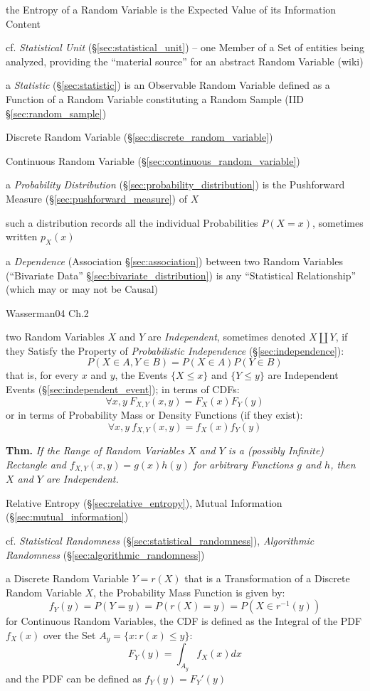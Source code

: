 the Entropy of a Random Variable is the Expected Value of its Information
Content

\fist cf. \emph{Statistical Unit} (\S\ref{sec:statistical_unit}) -- one Member
of a Set of entities being analyzed, providing the ``material source'' for an
abstract Random Variable (wiki)

\fist a \emph{Statistic} (\S\ref{sec:statistic}) is an Observable Random
Variable defined as a Function of a Random Variable constituting a Random Sample
(IID \S\ref{sec:random_sample})

Discrete Random Variable (\S\ref{sec:discrete_random_variable})

Continuous Random Variable (\S\ref{sec:continuous_random_variable})

a \emph{Probability Distribution} (\S\ref{sec:probability_distribution})
is the Pushforward Measure (\S\ref{sec:pushforward_measure}) of $X$

such a distribution records all the individual Probabilities $P(X = x)$,
sometimes written $p_X(x)$

a \emph{Dependence} (Association \S\ref{sec:association}) between two Random
Variables (``Bivariate Data'' \S\ref{sec:bivariate_distribution}) is any
``Statistical Relationship'' (which may or may not be Causal)

Wasserman04 Ch.2

two Random Variables $X$ and $Y$ are \emph{Independent}, sometimes denoted
$X \coprod Y$, if they Satisfy the Property of \emph{Probabilistic Independence}
(\S\ref{sec:independence}):
\[
  P(X \in A, Y \in B) = P(X \in A) P(Y \in B)
\]
that is, for every $x$ and $y$, the Events $\{X \leq x\}$ and $\{Y \leq y\}$ are
Independent Events (\S\ref{sec:independent_event}); in terms of CDFs:
\[
  \forall x,y\ F_{X,Y}(x,y) = F_X(x)F_Y(y)
\]
or in terms of Probability Mass or Density Functions (if they exist):
\[
  \forall x,y\ f_{X,Y}(x,y) = f_X(x)f_Y(y)
\]

\textbf{Thm.} \emph{If the Range of Random Variables $X$ and $Y$ is a (possibly
  Infinite) Rectangle and $f_{X,Y}(x,y) = g(x)h(y)$ for arbitrary Functions $g$
  and $h$, then $X$ and $Y$ are Independent.}

\fist Relative Entropy (\S\ref{sec:relative_entropy}), Mutual Information
(\S\ref{sec:mutual_information})

cf. \emph{Statistical Randomness} (\S\ref{sec:statistical_randomness}),
\emph{Algorithmic Randomness} (\S\ref{sec:algorithmic_randomness})

a Discrete Random Variable $Y = r(X)$ that is a Transformation of a Discrete
Random Variable $X$, the Probability Mass Function is given by:
\[
  f_Y(y) = P(Y = y) = P(r(X) = y) = P(X \in r^{-1}(y))
\]
for Continuous Random Variables, the CDF is defined as the Integral of the PDF
$f_X(x)$ over the Set $A_y = \{x : r(x) \leq y\}$:
\[
  F_Y(y) = \int_{A_y} f_X(x) dx
\]
and the PDF can be defined as $f_Y(y) = F_Y'(y)$

